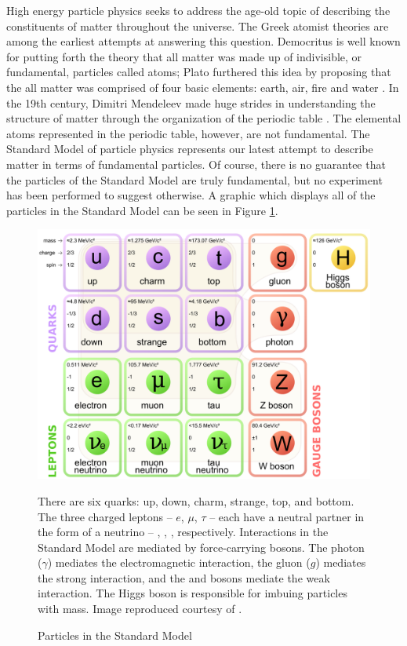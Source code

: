 High energy particle physics seeks to address the age-old topic
of describing the
constituents of matter throughout the universe.  The Greek atomist theories are
among the earliest attempts at answering this question.
Democritus is well
known for putting forth the theory that all matter was made up of indivisible,
or fundamental, particles called atoms;  Plato furthered this idea by proposing
that the all matter was comprised of four basic elements: earth, air, fire and
water \cite{berryman2008atomism}.  In the 19th century,
Dimitri Mendeleev made huge strides in
understanding the structure of matter through the organization of the periodic
table \cite{halzen1984quarks}.
The elemental atoms represented in the periodic table, however, are not
fundamental.  The Standard Model of particle physics
represents our latest attempt to describe matter in terms of fundamental
particles.  Of course, there is no guarantee that the particles of the Standard
Model are truly fundamental, but no experiment has been performed to suggest
otherwise.  A graphic which displays all of the particles in the Standard Model
can be seen in Figure \ref{sm}.



\begin{figure}
  \begin{center}
    \includegraphics[width=\textwidth]{figures/figures/sm.png}
  \end{center}
  \caption{Particles in the
  Standard Model}{
  There are six quarks: up, down, charm, strange, top, and
  bottom.
  The three charged leptons -- $e$, $\mu$, $\tau$ -- each have a neutral partner
  in the form of a neutrino -- \nue, \numu, \nutau, respectively.
  Interactions in the Standard Model are mediated by force-carrying bosons.
  The photon ($\gamma$) mediates the electromagnetic interaction, the gluon
  ($g$) mediates the strong interaction, and the \wb and \zb bosons
  mediate the weak interaction.
  The Higgs boson is responsible for imbuing particles with mass.
  Image reproduced courtesy of \cite{smWikiCitation}.
  }
  \label{sm}
\end{figure}

